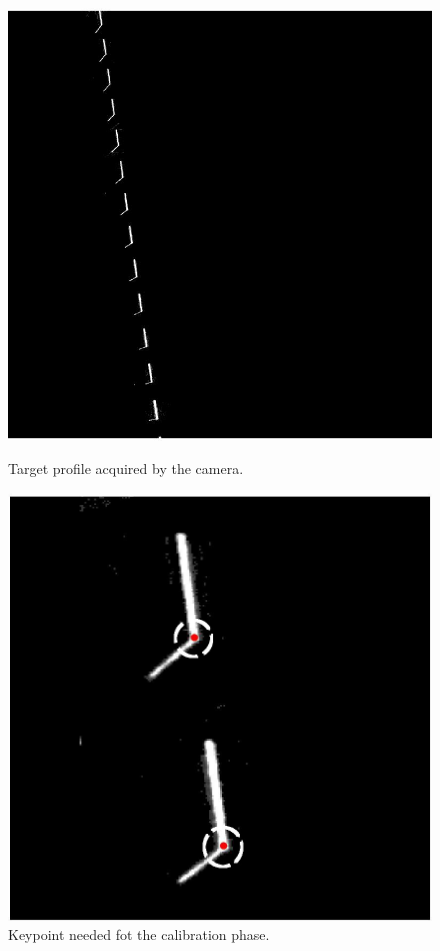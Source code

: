   \begin{figure}[t!]
    \begin{minipage}[c]{.48\textwidth}
      \centering
      \includegraphics[angle=270, origin=c, width=\textwidth]{./images/analysis/laser_profile_over-gage.jpg}
      \caption{Target profile acquired by the camera.}
      \label{fig:calib3}
    \end{minipage}
    \hfill
    \begin{minipage}[c]{.48\textwidth}
      \centering
      \includegraphics[angle=270, origin=c, width=\textwidth]{./images/analysis/laser_profile_over-gage_corner_det.jpg}
      \caption{Keypoint needed fot the calibration phase.}
      \label{fig:calib4}
    \end{minipage}
  \end{figure}
